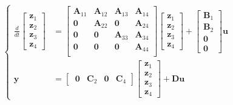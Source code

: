 \documentclass[letterpaper,10pt,english]{jupyterBook}
\begin{document}
\begin{equation*}
\begin{split}\left\{\begin{aligned}
  \frac{d}{dt} \begin{bmatrix} \mathbf{z}_1 \\ \mathbf{z}_2 \\ \mathbf{z}_3 \\ \mathbf{z}_4 \end{bmatrix} & =
  \begin{bmatrix} 
     \mathbf{A}_{11} & \mathbf{A}_{12} & \mathbf{A}_{13} & \mathbf{A}_{14} \\ 
     \mathbf{0}      & \mathbf{A}_{22} & \mathbf{0}      & \mathbf{A}_{24} \\ 
     \mathbf{0}      & \mathbf{0}      & \mathbf{A}_{33} & \mathbf{A}_{34} \\ 
     \mathbf{0}      & \mathbf{0}      & \mathbf{0}      & \mathbf{A}_{44} \\ 
  \end{bmatrix}
  \begin{bmatrix} \mathbf{z}_1 \\ \mathbf{z}_2 \\ \mathbf{z}_3 \\ \mathbf{z}_4 \end{bmatrix} +
  \begin{bmatrix} \mathbf{B}_1 \\ \mathbf{B}_2 \\ \mathbf{0} \\ \mathbf{0} \end{bmatrix} \mathbf{u} \\
  \mathbf{y} & = \begin{bmatrix} \ \mathbf{0} & \mathbf{C}_2 & \mathbf{0} & \mathbf{C}_4 \end{bmatrix}
  \begin{bmatrix} \mathbf{z}_1 \\ \mathbf{z}_2 \\ \mathbf{z}_3 \\ \mathbf{z}_4 \end{bmatrix} +
  \mathbf{D} \mathbf{u} 
\end{aligned}\right.\end{split}
\end{equation*}
\end{document}
